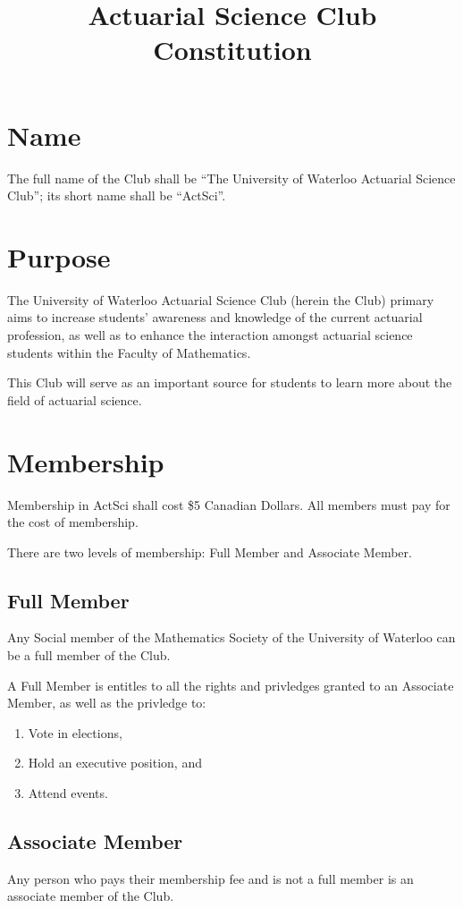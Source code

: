 \documentclass[11pt]{mathsoc}
\title{Actuarial Science Club Constitution}
\begin{document}

\setcounter{tocdepth}{4}
{\large \tableofcontents}

\newpage

\section{Name}
The full name of the Club shall be “The University of Waterloo Actuarial 
Science Club”; its short name shall be “ActSci”.

\section{Purpose}
The University of Waterloo Actuarial Science Club (herein the Club) primary 
aims to increase students’ awareness and knowledge of the current actuarial 
profession, as well as to enhance the interaction amongst actuarial science 
students within the Faculty of Mathematics.  

This Club will serve as an important source for students to learn more about 
the field of actuarial science.  

\section{Membership}
Membership in ActSci shall cost \$5 Canadian Dollars. All members must
pay for the cost of membership.

There are two levels of membership: Full Member and Associate Member.  

\subsection{Full Member}
Any Social member of the Mathematics Society of the University of 
Waterloo can be a full member of the Club. 

A Full Member is entitles to all the rights and privledges granted 
to an Associate Member, as well as the privledge to:
\begin{enumerate}
    \item Vote in elections, 
    \item Hold an executive position, and
    \item Attend events.
\end{enumerate}

\subsection{Associate Member}
Any person who pays their membership fee and is not a full member is an 
associate  member of the Club. 
\end{document}
